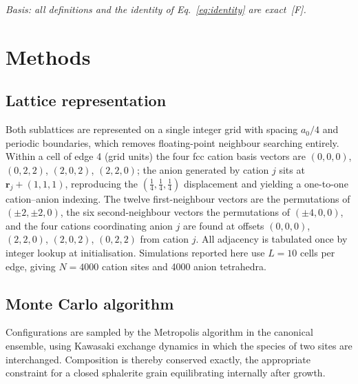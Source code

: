 \documentclass[11pt,a4paper]{article}
\begin{document}
\textit{Basis: all definitions and the identity of Eq.~\eqref{eq:identity} are
exact~[F].}

\section{Methods}

\subsection{Lattice representation}

Both sublattices are represented on a single integer grid with spacing $a_0/4$
and periodic boundaries, which removes floating-point neighbour searching
entirely. Within a cell of edge 4 (grid units) the four fcc cation basis vectors
are $(0,0,0)$, $(0,2,2)$, $(2,0,2)$, $(2,2,0)$; the anion generated by cation
$j$ sits at $\mathbf{r}_j + (1,1,1)$, reproducing the
$(\tfrac14,\tfrac14,\tfrac14)$ displacement and yielding a one-to-one
cation--anion indexing. The twelve first-neighbour vectors are the permutations
of $(\pm2,\pm2,0)$, the six second-neighbour vectors the permutations of
$(\pm4,0,0)$, and the four cations coordinating anion $j$ are found at offsets
$(0,0,0)$, $(2,2,0)$, $(2,0,2)$, $(0,2,2)$ from cation $j$. All adjacency is
tabulated once by integer lookup at initialisation. Simulations reported here
use $L = 10$ cells per edge, giving $N = 4000$ cation sites and 4000 anion
tetrahedra.

\subsection{Monte Carlo algorithm}

Configurations are sampled by the Metropolis algorithm \citep{metropolis1953}
in the canonical ensemble, using Kawasaki exchange dynamics
\citep{kawasaki1966} in which the species of two sites are interchanged. Composition is thereby conserved exactly, the appropriate
constraint for a closed sphalerite grain equilibrating internally after growth.
\end{document}
